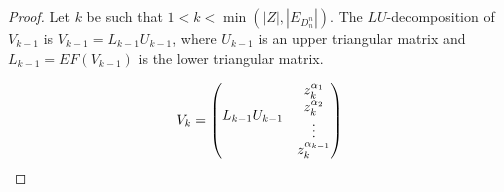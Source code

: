 \documentclass[11pt]{llncs}
\begin{document}
\begin{proof}
    Let $k$ be such that $1<k< \min{\left(|Z|,|E_{D_n^n}|\right)}$. The $LU$-decomposition of $V_{k-1}$ is  
        $V_{k-1} = L_{k-1} U_{k-1}$, %
    where $U_{k-1}$ is an upper triangular matrix and $L_{k-1} = EF\left(V_{k-1}\right)$ is the lower triangular matrix.

\[
V_{k} = 
\begin{pmatrix}
\multicolumn{4}{c}{\multirow{4}{*}{$L_{k-1}U_{k-1}$}} & z_k^{\alpha_1}\\
& & & & z_k^{\alpha_2}\\
& & & & \vdots\\
& & & & z_{k}^{\alpha_{k-1}}\\

\end{pmatrix}\]
\end{proof}
\end{document}
